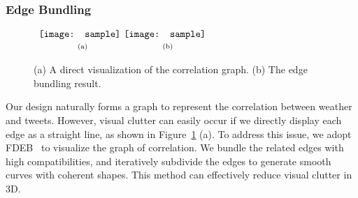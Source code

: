 


\subsubsection{Edge Bundling}
\label{sec:line}

\begin{figure}[t]
\begin{center}
$\begin{array}{c@{\hspace{0.01\linewidth}}c}
\texttt{[image: sample]} &
\texttt{[image: sample]}
\\
\mbox{\small{(a)}} & \mbox{\small{(b)}}
\end{array}$
\end{center}
\vspace{-.1in}
\caption{(a) A direct visualization of the correlation graph. (b) The edge bundling result.}
\label{fig:compareline}
\end{figure}

Our design naturally forms a graph to represent the correlation between weather and tweets. However, visual clutter can easily occur if we directly display each edge as a straight line, as shown in Figure~\ref{fig:compareline} (a).
%
To address this issue, we adopt FDEB~\cite{holten2009force} to visualize the graph of correlation. We bundle the related edges with high compatibilities, and iteratively subdivide the edges to generate smooth curves with coherent shapes. This method can effectively reduce visual clutter in 3D.

